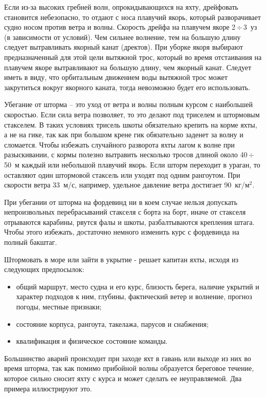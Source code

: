 \documentclass[a4paper, 12pt, twoside, final, book, russian, fittopage, cyremdash]{ncc}
\newcommand{\otdo}{\,\ensuremath{\div}\,}
\newcommand{\kgmsq}{~кг/м$^2$\xspace}
\begin{document}
Если из-за высоких гребней волн, опрокидывающихся на яхту, дрейфовать становится небезопасно, то отдают с носа плавучий якорь, который разворачивает судно носом против ветра и волны. Скорость дрейфа на плавучем якоре 2\otdo 3~уз (в зависимости от условий). Чем сильнее волнение, тем на большую длину следует вытравливать якорный канат (дректов). При уборке якоря выбирают предназначенный для этой цели вытяжной трос, который во время отстаивания на плавучем якоре вытравливают на большую длину, чем якорный канат. Следует иметь в виду, что орбитальным движением воды вытяжной трос может закрутиться вокруг якорного каната, тогда невозможно будет его использовать. 

Убегание от шторма \--- это уход от ветра и волны полным курсом с наибольшей скоростью. Если сила ветра позволяет, то это делают под триселем и штормовым стакселем. В таких условиях трисель шкоты обязательно крепить на корме яхты, а не на гике, так как при большом крене гик обязательно заденет за волну и сломается. Чтобы избежать случайного разворота яхты лагом к волне при разыскивании, с кормы полезно вытравить несколько тросов длиной около 40\otdo 50~м каждый или небольшой плавучий якорь. Если шторм переходит в ураган, то оставляют один штормовой стаксель или уходят под одним рангоутом. При скорости ветра 33~м/с, например, удельное давление ветра достигает 90\kgmsq. 

При убегании от шторма на фордевинд ни в коем случае нельзя допускать непроизвольных перебрасываний стакселя с борта на борт, иначе от стакселя отрываются карабины, рвутся фалы и шкоты, разбалтываются крепления штага. Чтобы этого избежать, достаточно немного изменить курс с фордевинда на полный бакштаг.

Штормовать в море или зайти в укрытие - решает капитан яхты, исходя из следующих предпосылок: 
\begin{itemize}
\item общий маршрут, место судна и его курс, близость берега, наличие укрытий и характер подходов к ним, глубины, фактический ветер и волнение, прогноз погоды, местные признаки; 
\item состояние корпуса, рангоута, такелажа, парусов и снабжения; 
\item квалификация и физическое состояние команды. 
\end{itemize}

Большинство аварий происходит при заходе яхт в гавань или выходе из них во время шторма, так как помимо прибойной волны образуется береговое течение, которое сильно сносит яхту с курса и может сделать ее неуправляемой. Два примера иллюстрируют это.
\end{document}

